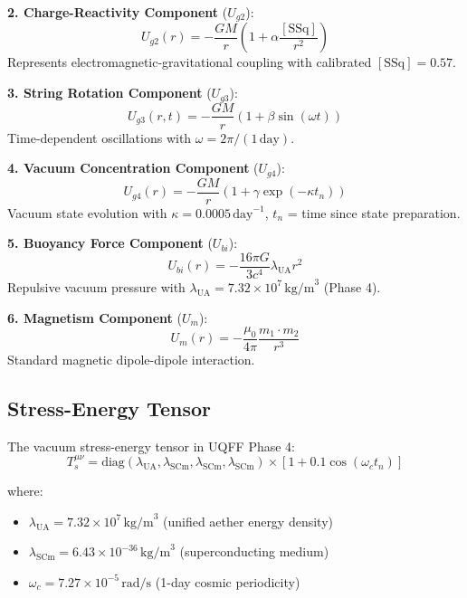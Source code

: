 \documentclass[12pt,a4paper]{article}
\begin{document}
\textbf{2. Charge-Reactivity Component} ($U_{g2}$):
\begin{equation}
U_{g2}(r) = -\frac{G M}{r} \left( 1 + \alpha \frac{[\text{SSq}]}{r^2} \right)
\label{eq:ug2}
\end{equation}
Represents electromagnetic-gravitational coupling with calibrated $[\text{SSq}] = 0.57$.

\textbf{3. String Rotation Component} ($U_{g3}$):
\begin{equation}
U_{g3}(r, t) = -\frac{G M}{r} \left( 1 + \beta \sin(\omega t) \right)
\label{eq:ug3}
\end{equation}
Time-dependent oscillations with $\omega = 2\pi/(1\,\text{day})$.

\textbf{4. Vacuum Concentration Component} ($U_{g4}$):
\begin{equation}
U_{g4}(r) = -\frac{G M}{r} \left( 1 + \gamma \exp(-\kappa t_n) \right)
\label{eq:ug4}
\end{equation}
Vacuum state evolution with $\kappa = 0.0005\,\text{day}^{-1}$, $t_n$ = time since state preparation.

\textbf{5. Buoyancy Force Component} ($U_{bi}$):
\begin{equation}
U_{bi}(r) = -\frac{16 \pi G}{3 c^4} \lambda_{\text{UA}} r^2
\label{eq:ubi}
\end{equation}
Repulsive vacuum pressure with $\lambda_{\text{UA}} = 7.32 \times 10^7\,\text{kg/m}^3$ (Phase 4).

\textbf{6. Magnetism Component} ($U_m$):
\begin{equation}
U_m(r) = -\frac{\mu_0}{4\pi} \frac{m_1 \cdot m_2}{r^3}
\label{eq:um}
\end{equation}
Standard magnetic dipole-dipole interaction.

\subsection{Stress-Energy Tensor}

The vacuum stress-energy tensor in UQFF Phase 4:
\begin{equation}
T_s^{\mu\nu} = \text{diag}(\lambda_{\text{UA}}, \lambda_{\text{SCm}}, \lambda_{\text{SCm}}, \lambda_{\text{SCm}}) \times \left[1 + 0.1 \cos(\omega_c t_n)\right]
\label{eq:stress_energy}
\end{equation}

where:
\begin{itemize}
    \item $\lambda_{\text{UA}} = 7.32 \times 10^7\,\text{kg/m}^3$ (unified aether energy density)
    \item $\lambda_{\text{SCm}} = 6.43 \times 10^{-36}\,\text{kg/m}^3$ (superconducting medium)
    \item $\omega_c = 7.27 \times 10^{-5}\,\text{rad/s}$ (1-day cosmic periodicity)
\end{itemize}
\end{document}
